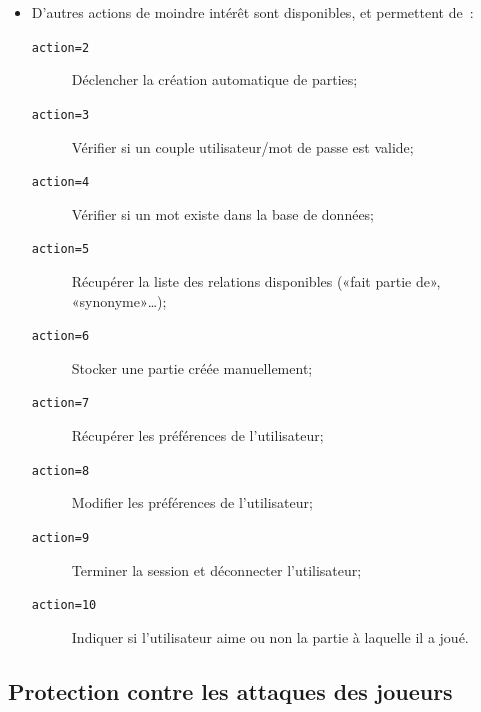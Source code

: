 \documentclass[a4paper,11pt,french]{article}
\begin{document}
{\begin{itemize}
\verb!server.php?action=1&gid=!\textit{\texttt{numéro de partie}}\verb!&pgid=!\textit{\texttt{numéro de partie}}

Cette requête doit aussi prendre un couple \textit{\texttt{numéro du mot du nuage}}\verb!=!\textit{\texttt{numéro de la relation}} pour
chaque réponse. Elle renvoie la structure suivante~:
{
\small
\begin{alltt}
\{
\quad"scoreTotal":\textit{Score pour la partie},
\quad"alreadyPlayed":\textit{true si la partie a déjà été jouée, false sinon},
\quad"author":\textit{Créateur de la partie}",
\quad"minScore":\textit{Plus petit score pour un mot},
\quad"maxScore":\textit{Plus grand score pour un mot},
\quad"newGame":\textit{Nouvelle partie, même format que action=0},
\quad"scores":[
\quad\quad\{"name":"\textit{Mot nuage}", "score":\textit{Score pour le mot}\}
\quad]
\}
\end{alltt}
}

\item D'autres actions de moindre intérêt sont disponibles, et permettent de~:
\begin{description}
\item[\verb!action=2!] Déclencher la création automatique de parties;
\item[\verb!action=3!] Vérifier si un couple utilisateur/mot de passe est valide;
\item[\verb!action=4!] Vérifier si un mot existe dans la base de données;
\item[\verb!action=5!] Récupérer la liste des relations disponibles («fait partie de», «synonyme»…);
\item[\verb!action=6!] Stocker une partie créée manuellement;
\item[\verb!action=7!] Récupérer les préférences de l'utilisateur;
\item[\verb!action=8!] Modifier les préférences de l'utilisateur;
\item[\verb!action=9!] Terminer la session et déconnecter l'utilisateur;
\item[\verb!action=10!] Indiquer si l'utilisateur aime ou non la partie à laquelle il a joué.
\end{description}

\end{itemize}

\subsection{Protection contre les attaques des joueurs}

}
\end{document}
